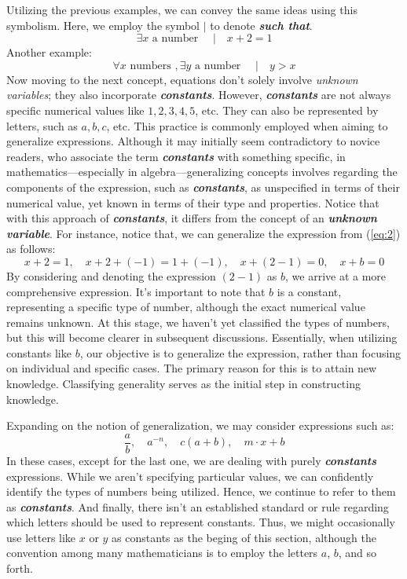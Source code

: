 Utilizing the previous examples, we can convey the same ideas using this symbolism. Here, we employ the symbol
$|$ to denote \textbf{\textit{such that}}.
\[
  \exists x \text{ a number } \quad | \quad  x + 2 = 1
\]
Another example:
\[
  \forall x \text{ numbers }, \exists y \text{ a number } \quad | \quad y > x
\]
Now moving to the next concept, equations don't solely involve \textit{unknown variables}; they also incorporate \textbf{\textit{constants}}. However, \textbf{\textit{constants}} are not always specific numerical values like $1, 2, 3, 4, 5$, etc. They can also be represented by letters, such as $a, b, c$, etc.
This practice is commonly employed when aiming to generalize expressions. Although it may initially seem contradictory to novice readers, who associate the term \textbf{\textit{constants}} with something specific, in mathematics—especially in algebra—generalizing concepts involves regarding the components of the expression, such as \textbf{\textit{constants}}, as unspecified in terms of their numerical value, yet known in terms of their type and properties. Notice that with this approach of \textbf{\textit{constants}}, it differs from the concept of an \textit{\textbf{unknown variable}}. For instance, notice that, we can generalize the expression from (\ref{eq:2}) as follows:
\begin{equation} \label{eq:5}
  x + 2 = 1,\quad x + 2 + (-1) = 1 + (-1),\quad x + (2 - 1) = 0, \quad x + b = 0
\end{equation}
By considering and denoting the expression $(2 - 1)$ as $b$, we arrive at a more comprehensive expression. It's important to note that $b$ is a constant, representing a specific type of number, although the exact numerical value remains unknown. At this stage, we haven't yet classified the types of numbers, but this will become clearer in subsequent discussions. Essentially, when utilizing constants like $b$, our objective is to generalize the expression, rather than focusing on individual and specific cases. The primary reason for this is to attain new knowledge. Classifying generality serves as the initial step in constructing knowledge.

Expanding on the notion of generalization, we may consider expressions such as:
\[
  \frac{a}{b},\quad a^{-n},\quad c(a + b), \quad m \cdot x + b
\]
In these cases, except for the last one, we are dealing with purely \textbf{\textit{constants}} expressions. While we aren't specifying particular values, we can confidently identify the types of numbers being utilized. Hence, we continue to refer to them as \textbf{\textit{constants}}.
And finally, there isn't an established standard or rule regarding which letters should be used to represent constants. Thus, we might occasionally use letters like $x$ or $y$ as constants as the beging of this section, although the convention among many mathematicians is to employ the letters $a$, $b$, and so forth.

